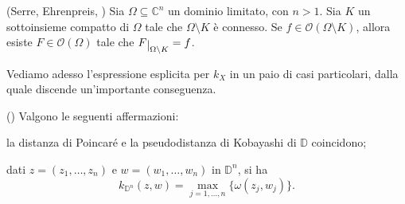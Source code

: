 \begin{thm} \label{hartogs_fen}
    (Serre, Ehrenpreis, \cite[Theorem 1.2.6]{Kr}) Sia $\Omega \subseteq \mathbb{C}^n$ un dominio limitato, con $n>1$. Sia $K$ un sottoinsieme compatto di $\Omega$ tale che $\Omega\setminus K$ è connesso. Se $f\in\mathcal{O}(\Omega\setminus K)$, allora esiste $F\in\mathcal{O}(\Omega)$ tale che $F\restrict{\Omega\setminus K}=f$.
\end{thm}

Vediamo adesso l'espressione esplicita per $k_X$ in un paio di casi particolari, dalla quale discende un'importante conseguenza.

\begin{prop} \label{k_polidisco}
    (\cite[Proposition 2.3.4 and Corollary 2.3.7]{A1}) Valgono le seguenti affermazioni:
    \begin{nlist}
        \item la distanza di Poincaré e la pseudodistanza di Kobayashi di $\mathbb{D}$ coincidono;
        \item dati $z=(z_1,\dots,z_n)$ e $w=(w_1,\dots,w_n)$ in $\mathbb{D}^n$, si ha
        $$k_{\mathbb{D}^n}(z,w)=\max_{j=1,\dots,n}\{\omega(z_j,w_j)\}.$$
    \end{nlist}
\end{prop}
